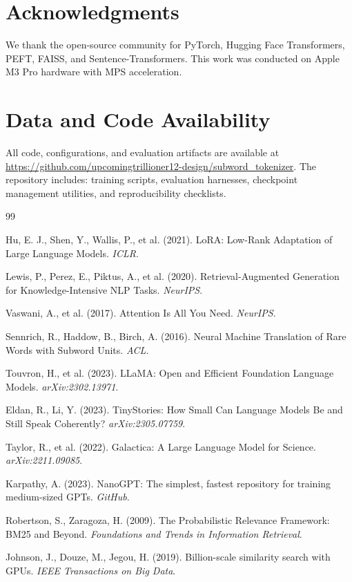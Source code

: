 \documentclass[11pt,a4paper]{article}
\begin{document}
\section*{Acknowledgments}

We thank the open-source community for PyTorch, Hugging Face Transformers, PEFT, FAISS, and Sentence-Transformers. This work was conducted on Apple M3 Pro hardware with MPS acceleration.

\section*{Data and Code Availability}

All code, configurations, and evaluation artifacts are available at \url{https://github.com/upcomingtrillioner12-design/subword_tokenizer}. The repository includes: training scripts, evaluation harnesses, checkpoint management utilities, and reproducibility checklists.

\begin{thebibliography}{99}

 Hu, E. J., Shen, Y., Wallis, P., et al. (2021). LoRA: Low-Rank Adaptation of Large Language Models. \textit{ICLR}.

 Lewis, P., Perez, E., Piktus, A., et al. (2020). Retrieval-Augmented Generation for Knowledge-Intensive NLP Tasks. \textit{NeurIPS}.

 Vaswani, A., et al. (2017). Attention Is All You Need. \textit{NeurIPS}.

 Sennrich, R., Haddow, B., Birch, A. (2016). Neural Machine Translation of Rare Words with Subword Units. \textit{ACL}.

 Touvron, H., et al. (2023). LLaMA: Open and Efficient Foundation Language Models. \textit{arXiv:2302.13971}.

 Eldan, R., Li, Y. (2023). TinyStories: How Small Can Language Models Be and Still Speak Coherently? \textit{arXiv:2305.07759}.

 Taylor, R., et al. (2022). Galactica: A Large Language Model for Science. \textit{arXiv:2211.09085}.

 Karpathy, A. (2023). NanoGPT: The simplest, fastest repository for training medium-sized GPTs. \textit{GitHub}.

 Robertson, S., Zaragoza, H. (2009). The Probabilistic Relevance Framework: BM25 and Beyond. \textit{Foundations and Trends in Information Retrieval}.

 Johnson, J., Douze, M., Jegou, H. (2019). Billion-scale similarity search with GPUs. \textit{IEEE Transactions on Big Data}.

\end{thebibliography}
\end{document}
